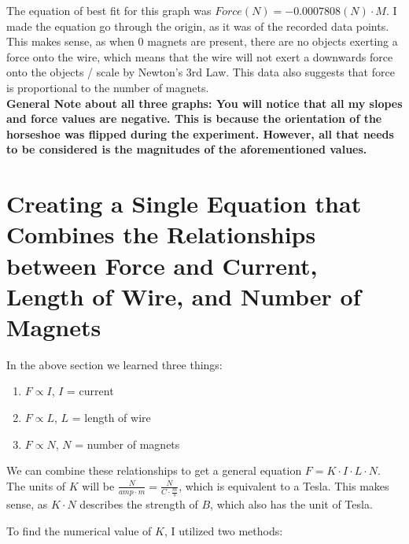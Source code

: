\documentclass[11pt,twoside]{article}
\begin{document}
The equation of best fit for this graph was $Force (N) = -0.0007808 (N) \cdot M$. I made the equation go through the origin, as it was of the recorded data points. This makes sense, as when $0$ magnets are present, there are no objects exerting a force onto the wire, which means that the wire will not exert a downwards force onto the objects / scale by Newton's 3rd Law. This data also suggests that force is proportional to the number of magnets. \\

\textbf{General Note about all three graphs: You will notice that all my slopes and force values are negative. This is because the orientation of the horseshoe was flipped during the experiment. However, all that needs to be considered is the magnitudes of the aforementioned values.}

\section{Creating a Single Equation that Combines the Relationships between Force and Current, Length of Wire, and Number of Magnets}

In the above section we learned three things: 

\begin{enumerate}
\item $F \propto I$, $I$ = current
\item $F \propto L$, $L$ = length of wire
\item $F \propto N$, $N$ = number of magnets
\end{enumerate}

We can combine these relationships to get a general equation $F = K \cdot I \cdot L \cdot N$. The units of $K$ will be $\frac{N}{amp \cdot m} = \frac{N}{C \cdot \frac{m}{s}}$, which is equivalent to a Tesla. This makes sense, as $K \cdot N$ describes the strength of $B$, which also has the unit of Tesla.

To find the numerical value of $K$, I utilized two methods: 
\end{document}
